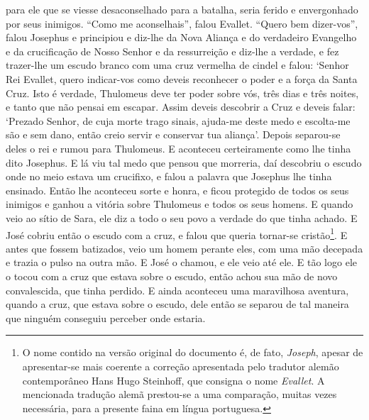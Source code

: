 para ele que se viesse desaconselhado para a batalha, seria ferido e
envergonhado por seus inimigos. “Como me aconselhais”, falou Evallet. “Quero
bem dizer-vos”, falou Josephus e principiou e diz-lhe da Nova Aliança e do
verdadeiro Evangelho e da crucificação de Nosso Senhor e da ressurreição e
diz-lhe a verdade, e fez trazer-lhe um escudo branco com uma cruz vermelha de
cindel e falou: ‘Senhor Rei Evallet, quero indicar-vos como deveis reconhecer o
poder e a força da Santa Cruz. Isto é verdade, Thulomeus deve ter poder sobre
vós, três dias e três noites, e tanto que não pensai em escapar. Assim deveis
descobrir a Cruz e deveis falar: ‘Prezado Senhor, de cuja morte trago sinais,
ajuda-me deste medo e escolta-me são e sem dano, então creio servir e conservar
tua aliança’. Depois separou-se deles o rei e rumou para Thulomeus. E aconteceu
certeiramente como lhe tinha dito Josephus. E lá viu tal medo que pensou que
morreria, daí descobriu o escudo onde no meio estava um crucifixo, e falou a
palavra que Josephus lhe tinha ensinado. Então lhe aconteceu sorte e honra, e
ficou protegido de todos os seus inimigos e ganhou a vitória sobre Thulomeus e
todos os seus homens. E quando veio ao sítio de Sara, ele diz a todo o seu povo
a verdade do que tinha achado. E José cobriu então o escudo com a cruz, e falou
que queria tornar-se cristão\footnote{ O nome contido na versão original do
documento é, de fato, \textit{Joseph}, apesar de apresentar-se mais coerente a
correção apresentada pelo tradutor alemão contemporâneo Hans Hugo Steinhoff,
que consigna o nome \textit{Evallet}. A mencionada tradução alemã prestou-se a
uma comparação, muitas vezes necessária, para a presente faina em língua
portuguesa.}. E antes que fossem batizados, veio um homem perante
eles, com uma mão decepada e trazia o pulso na outra mão. E José o chamou, e
ele veio até ele. E tão logo ele o tocou com a cruz que estava sobre o escudo,
então achou sua mão de novo convalescida, que tinha perdido. E ainda aconteceu
uma maravilhosa aventura, quando a cruz, que estava sobre o escudo, dele então
se separou de tal maneira que ninguém conseguiu perceber onde estaria. 

